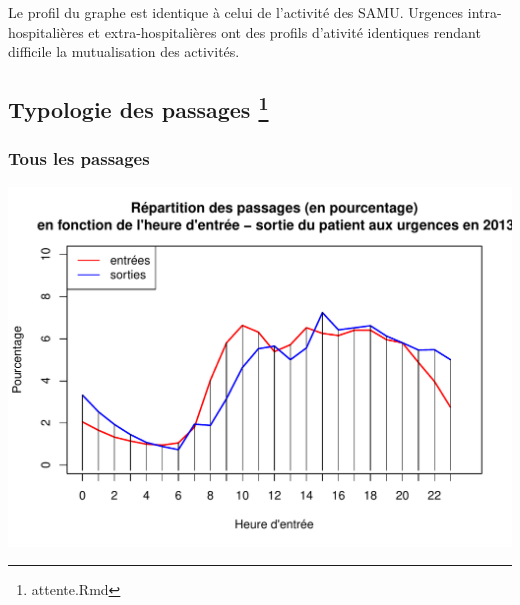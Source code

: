 \documentclass[12pt,english,french,twoside]{book}\usepackage[]{graphicx}\usepackage[]{color}
\makeatletter
\def\maxwidth{ %
  \ifdim\Gin@nat@width>\linewidth
    \linewidth
  \else
    \Gin@nat@width
  \fi
}
\newenvironment{knitrout}{}{} %
\makeatother
\begin{document}
Le profil du graphe est identique à celui de l'activité des SAMU. Urgences intra-hospitalières et extra-hospitalières ont des profils d'ativité identiques rendant difficile la mutualisation des activités.

\subsection{Typologie des passages \protect\footnote{attente.Rmd}} 


\subsubsection*{Tous les passages}

 
 \begin{center}
\begin{knitrout}
\color{fgcolor}
\includegraphics[width=\maxwidth]{figure/sau_arrive_depart-1} 

\end{knitrout}
\label{fig:sau_arrive_depart}
\end{center}
\end{document}
